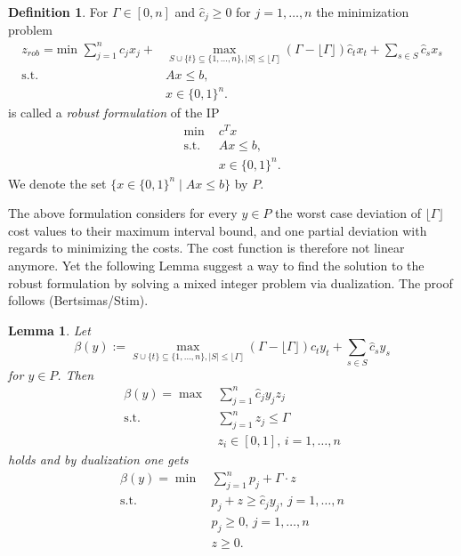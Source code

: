 \documentclass[titlepage, a4paper]{amsbook}
\theoremstyle{plain}
\newtheorem{lem}[thm]{Lemma}
\theoremstyle{break}
\theoremstyle{definition}
\newtheorem{dfn}[thm]{Definition}
\theoremstyle{remark}
\numberwithin{equation}{thm}
\begin{document}
\begin{dfn}\label{Robust Definition}
For $\Gamma \in [0,n]$ and $\hat{c}_j \geq 0$ for $j=1,\ldots, n$ the minimization problem
\begin{equation}\label{robustoriginal}
\begin{split}
    z_{rob}=\text{min } \sum_{j=1}^{n} c_j x_j + &\max_{S \cup \{t\} \subseteq \{1,\ldots,n\}, \vert S \vert \leq \lfloor \Gamma \rfloor}(\Gamma - \lfloor \Gamma \rfloor)\hat{c}_t x_t + \sum_{s \in S} \hat{c}_s x_s\\
    \text{s.t. } &Ax \leq b, \\
    &x \in \{0,1\}^n.
\end{split}
\end{equation}
is called a \emph{robust formulation} of the IP
\begin{equation}\label{IP}
\begin{split}
    \text{min } &c^T x \\
    \text{s.t. } &Ax \leq b, \\
    &x \in \{0,1\}^n.
\end{split}
\end{equation}
We denote the set $\{x \in \{0,1\}^n \mid Ax \leq b\}$ by $P$.
\end{dfn}
The above formulation considers for every $y \in P$ the worst case deviation of $\lfloor \Gamma \rfloor$ cost values to their maximum interval bound, and one partial deviation with regards to minimizing the costs. The cost function is therefore not linear anymore. Yet the following Lemma suggest a way to find the solution to the robust formulation by solving a mixed integer problem via dualization. The proof follows (Bertsimas/Stim).
\begin{lem}
Let 
\[\beta(y):=\max_{S \cup \{t\} \subseteq \{1,\ldots,n\}, \vert S \vert \leq \lfloor \Gamma \rfloor}(\Gamma - \lfloor \Gamma \rfloor)\hat{c}_t y_t + \sum_{s \in S} \hat{c}_s y_s\] 
for $y \in P$. Then 
\begin{equation}\label{eq. 1}
\begin{split}
  \beta(y)= \max\,&\sum_{j=1}^{n}\hat{c}_j y_j z_j \\
  \text{s.t. } &\sum_{j=1}^{n}z_j \leq \Gamma \\
  &z_i \in [0,1], \, i=1, \ldots, n
  \end{split}
\end{equation}
holds and by dualization one gets
\begin{equation}\label{eq. 2}
\begin{split}
  \beta(y)= \min\,&\sum_{j=1}^{n}p_j + \Gamma \cdot z \\
  \text{s.t. } &p_j+ z \geq \hat{c}_jy_j, \, j=1, \ldots,n\\
  &p_j \geq 0, \, j=1, \ldots, n \\
  &z \geq 0.
  \end{split}
\end{equation}
\end{lem}
\end{document}
